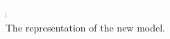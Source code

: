 \begin{figure}[ht]
\begin{center}
\begin{subfigure}{1.0\textwidth}
   \caption{}
\end{subfigure}
\begin{subfigure}{1.0\textwidth}
\centering
  \includegraphics[width=.3\linewidth]{Diagrams/SectorMembraneModes/membrane_modes_11.png}
  \caption{The representation of the new model.}
\end{subfigure}
  \caption[Sectoral membrane eigenmodes]{}
\end{center}
\end{figure}

